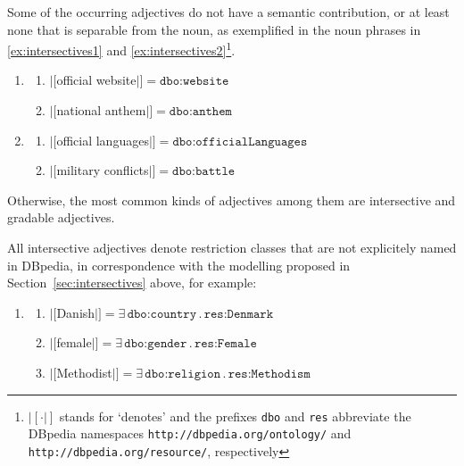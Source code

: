 \documentclass[11pt]{article}
\begin{document}
Some of the occurring adjectives do not have a semantic contribution, or at least none that is separable from the noun, 
as exemplified in the noun phrases in \ref{ex:intersectives1} and \ref{ex:intersectives2}\footnote{$|[\cdot|]$ stands for 
`denotes' and the prefixes \texttt{dbo} and \texttt{res} abbreviate the DBpedia namespaces \texttt{http://dbpedia.org/ontology/}
and \texttt{http://dbpedia.org/resource/}, respectively}.
\begin{enumerate}
\item \begin{enumerate}
 \item $|[$official website$|]=\texttt{dbo:website}$
 \item $|[$national anthem$|]=\texttt{dbo:anthem}$
 \end{enumerate}
 \label{ex:intersectives1}
\item \begin{enumerate}
 \item $|[$official languages$|]=\texttt{dbo:officialLanguages}$
 \item $|[$military conflicts$|]=\texttt{dbo:battle}$ 
 \end{enumerate}
 \label{ex:intersectives2}
\end{enumerate}

Otherwise, the most common kinds of adjectives among them are intersective and gradable adjectives.

All intersective adjectives denote restriction classes that are not explicitely named in DBpedia, 
in correspondence with the modelling proposed in Section~\ref{sec:intersectives} above, for example:
\begin{enumerate}
\item \begin{enumerate}
 \item $|[$Danish$|]=\exists\,\texttt{dbo:country}\,.\,\texttt{res:Denmark}$
 \item $|[$female$|]=\exists\,\texttt{dbo:gender}\,.\,\texttt{res:Female}$
 \item $|[$Methodist$|]=\exists\,\texttt{dbo:religion}\,.\,\texttt{res:Methodism}$
 \end{enumerate}
\end{enumerate}
\end{document}
